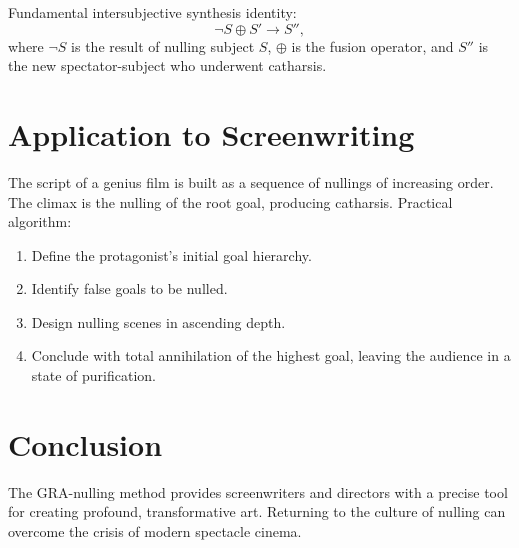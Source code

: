 \documentclass[12pt,a4paper]{article}
\begin{document}
Fundamental intersubjective synthesis identity:
\[
\neg S \oplus S' \longrightarrow S'',
\]
where $\neg S$ is the result of nulling subject $S$, $\oplus$ is the fusion operator, and $S''$ is the new spectator-subject who underwent catharsis.

\section{Application to Screenwriting}
The script of a genius film is built as a sequence of nullings of increasing order. The climax is the nulling of the root goal, producing catharsis. Practical algorithm:
\begin{enumerate}
\item Define the protagonist's initial goal hierarchy.
\item Identify false goals to be nulled.
\item Design nulling scenes in ascending depth.
\item Conclude with total annihilation of the highest goal, leaving the audience in a state of purification.
\end{enumerate}

\section{Conclusion}
The GRA-nulling method provides screenwriters and directors with a precise tool for creating profound, transformative art. Returning to the culture of nulling can overcome the crisis of modern spectacle cinema.
\end{document}
